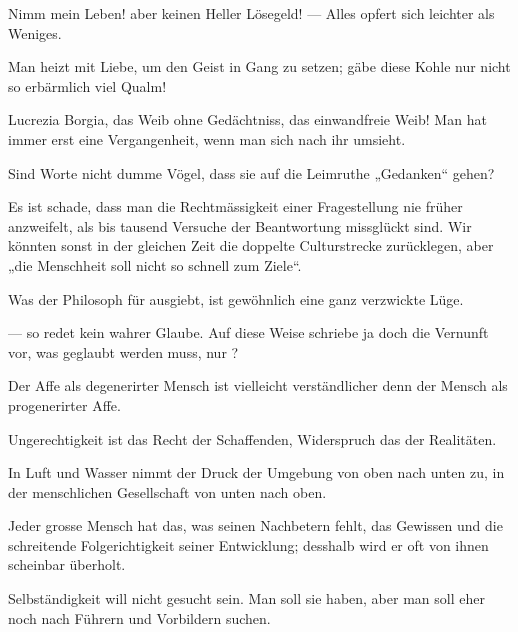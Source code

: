 Nimm mein Leben! aber keinen Heller Lösegeld! — Alles opfert sich leichter als Weniges.
\par

Man heizt mit Liebe, um den Geist in Gang zu setzen; gäbe diese Kohle nur nicht so erbärmlich viel Qualm!
\par

Lucrezia Borgia, das Weib ohne Gedächtniss,  das einwandfreie Weib! Man hat immer erst eine Vergangenheit, wenn man sich nach ihr umsieht.
\par

Sind Worte nicht dumme Vögel, dass sie auf die Leimruthe „Gedanken“ gehen?
\par

Es ist schade, dass man die Rechtmässigkeit einer Fragestellung nie früher anzweifelt, als bis tausend Versuche der Beantwortung missglückt sind. Wir könnten sonst in der gleichen Zeit die doppelte Culturstrecke zurücklegen, aber „die Menschheit soll nicht so schnell zum Ziele“.
\par

Was der Philosoph für ausgiebt, ist gewöhnlich eine ganz verzwickte Lüge.
\par

 — so redet kein wahrer Glaube. Auf diese Weise schriebe ja doch die Vernunft vor, was geglaubt werden muss, nur ?
\par

Der Affe als degenerirter Mensch ist vielleicht verständlicher denn der Mensch als progenerirter Affe.
\par

Ungerechtigkeit ist das Recht der Schaffenden, Widerspruch das der Realitäten.
\par

In Luft und Wasser nimmt der Druck der Umgebung von oben nach unten zu, in der menschlichen Gesellschaft von unten nach oben.
\par

Jeder grosse Mensch hat das, was seinen Nachbetern fehlt, das Gewissen und die schreitende Folgerichtigkeit seiner Entwicklung; desshalb wird er oft von ihnen scheinbar überholt.
\par

Selbständigkeit will nicht gesucht sein. Man soll sie haben, aber man soll eher noch nach Führern und Vorbildern suchen.
\par

